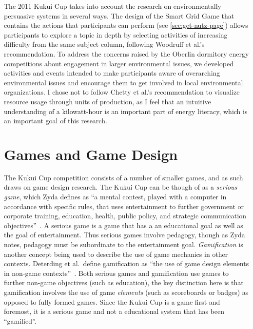 
The 2011 Kukui Cup takes into account the research on environmentally persuasive systems in several ways. The design of the Smart Grid Game that contains the actions that participants can perform (see \autoref{sec:get-nutz-page}) allows participants to explore a topic in depth by selecting activities of increasing difficulty from the same subject column, following Woodruff et al.'s recommendation. To address the concerns raised by the Oberlin dormitory energy competitions about engagement in larger environmental issues, we developed activities and events intended to make participants aware of overarching environmental issues and encourage them to get involved in local environmental organizations. I chose not to follow Chetty et al.'s recommendation to visualize resource usage through units of production, as I feel that an intuitive understanding of a kilowatt-hour is an important part of energy literacy, which is an important goal of this research.


\section{Games and Game Design}

The Kukui Cup competition consists of a number of smaller games, and as such draws on game design research. The Kukui Cup can be though of as a \emph{serious game}, which Zyda defines as ``a mental contest, played with a computer in accordance with specific rules, that uses entertainment to further government or corporate training, education, health, public policy, and strategic communication objectives''~\cite{Zyda2005}. A serious game is a game that has a an educational goal as well as the goal of entertainment. Thus serious games involve pedagogy, though as Zyda notes, pedagogy must be subordinate to the entertainment goal. \emph{Gamification} is another concept being used to describe the use of game mechanics in other contexts. Deterding et al.\ define gamification as ``the use of game design elements in non-game contexts''~\cite{Deterding-2011b}. Both serious games and gamification use games to further non-game objectives (such as education), the key distinction here is that gamification involves the use of game \emph{elements} (such as scoreboards or badges) as opposed to fully formed games. Since the Kukui Cup is a game first and foremost, it is a serious game and not a educational system that has been ``gamified''.

